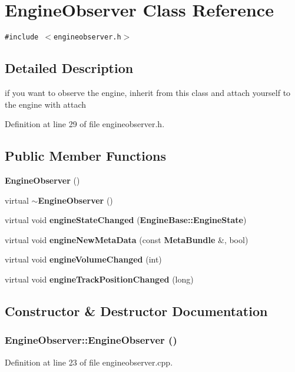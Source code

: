 \section{Engine\-Observer Class Reference}
\label{classEngineObserver}
{\tt \#include $<$engineobserver.h$>$}



\subsection{Detailed Description}
if you want to observe the engine, inherit from this class and attach yourself to the engine with attach 



Definition at line 29 of file engineobserver.h.\subsection*{Public Member Functions}
\begin{CompactItemize}
\item 
{\bf Engine\-Observer} ()
\item 
virtual {\bf $\sim$Engine\-Observer} ()
\item 
virtual void {\bf engine\-State\-Changed} ({\bf Engine\-Base::Engine\-State})
\item 
virtual void {\bf engine\-New\-Meta\-Data} (const {\bf Meta\-Bundle} \&, bool)
\item 
virtual void {\bf engine\-Volume\-Changed} (int)
\item 
virtual void {\bf engine\-Track\-Position\-Changed} (long)
\end{CompactItemize}


\subsection{Constructor \& Destructor Documentation}
\subsubsection{\setlength{\rightskip}{0pt plus 5cm}Engine\-Observer::Engine\-Observer ()}\label{classEngineObserver_EngineObservera0}




Definition at line 23 of file engineobserver.cpp.



